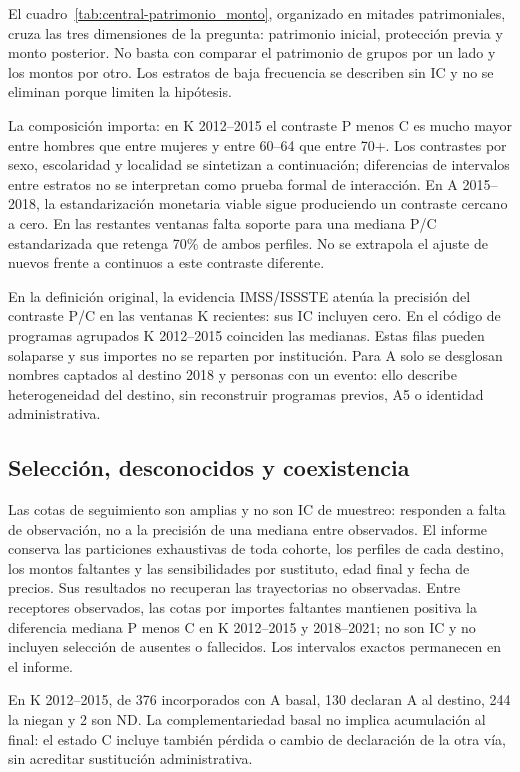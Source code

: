 El cuadro~\ref{tab:central-patrimonio_monto}, organizado en mitades patrimoniales, cruza las tres dimensiones de la pregunta: patrimonio inicial, protección previa y monto posterior. No basta con comparar el patrimonio de grupos por un lado y los montos por otro. Los estratos de baja frecuencia se describen sin IC y no se eliminan porque limiten la hipótesis.

La composición importa: en K 2012--2015 el contraste P menos C es mucho mayor entre hombres que entre mujeres y entre 60--64 que entre 70+. Los contrastes por sexo, escolaridad y localidad se sintetizan a continuación; diferencias de intervalos entre estratos no se interpretan como prueba formal de interacción. En A 2015--2018, la estandarización monetaria viable sigue produciendo un contraste cercano a cero. En las restantes ventanas falta soporte para una mediana P/C estandarizada que retenga 70\% de ambos perfiles. No se extrapola el ajuste de nuevos frente a continuos a este contraste diferente.

En la definición original, la evidencia IMSS/ISSSTE atenúa la precisión del contraste P/C en las ventanas K recientes: sus IC incluyen cero. En el código de programas agrupados K 2012--2015 coinciden las medianas. Estas filas pueden solaparse y sus importes no se reparten por institución. Para A solo se desglosan nombres captados al destino 2018 y personas con un evento: ello describe heterogeneidad del destino, sin reconstruir programas previos, A5 o identidad administrativa.

\subsection{Selección, desconocidos y coexistencia}


Las cotas de seguimiento son amplias y no son IC de muestreo: responden a falta de observación, no a la precisión de una mediana entre observados. El informe conserva las particiones exhaustivas de toda cohorte, los perfiles de cada destino, los montos faltantes y las sensibilidades por sustituto, edad final y fecha de precios. Sus resultados no recuperan las trayectorias no observadas. Entre receptores observados, las cotas por importes faltantes mantienen positiva la diferencia mediana P menos C en K 2012--2015 y 2018--2021; no son IC y no incluyen selección de ausentes o fallecidos. Los intervalos exactos permanecen en el informe.

En K 2012--2015, de 376 incorporados con A basal, 130 declaran A al destino, 244 la niegan y 2 son ND. La complementariedad basal no implica acumulación al final: el estado C incluye también pérdida o cambio de declaración de la otra vía, sin acreditar sustitución administrativa.

